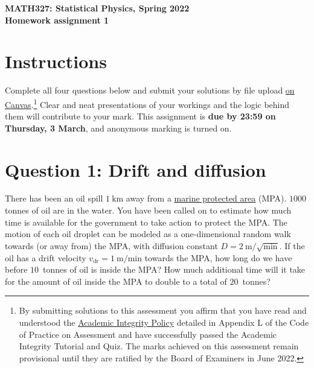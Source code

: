 \documentclass[12 pt]{article} %
\newcommand{\vdr}{\ensuremath{v_{\mathrm{dr}}} }
\begin{document}
\newcommand{\thisweek}{MATH327 Homework 1}
\newcommand{\moddate}{Last modified 21 Feb.~2022}
\begin{center}
  {\Large \textbf{MATH327: Statistical Physics, Spring 2022}} \\[12 pt]
  {\Large \textbf{Homework assignment 1}} \\[24 pt]
\end{center}

\section*{Instructions}
Complete all four questions below and submit your solutions by file upload \href{https://liverpool.instructure.com/courses/47333/assignments/178542}{on Canvas}.\footnote{By submitting solutions to this assessment you affirm that you have read and understood the \href{https://www.liverpool.ac.uk/media/livacuk/tqsd/code-of-practice-on-assessment/appendix_L_cop_assess.pdf}{Academic Integrity Policy} detailed in Appendix L of the Code of Practice on Assessment and have successfully passed the Academic Integrity Tutorial and Quiz.  The marks achieved on this assessment remain provisional until they are ratified by the Board of Examiners in June 2022.}
Clear and neat presentations of your workings and the logic behind them will contribute to your mark.
This assignment is \textbf{due by 23:59 on Thursday, 3 March}, and anonymous marking is turned on.



\vfill
\section*{Question 1: Drift and diffusion}
There has been an oil spill $1~\mathrm{km}$ away from a \href{https://en.wikipedia.org/wiki/Marine_protected_area}{marine protected area} (MPA).
$1000$ tonnes of oil are in the water.
You have been called on to estimate how much time is available for the government to take action to protect the MPA.
The motion of each oil droplet can be modeled as a one-dimensional random walk towards (or away from) the MPA, with diffusion constant $D = 2~\mathrm{m}/\sqrt{\mathrm{min}}$.
If the oil has a drift velocity $\vdr = 1~\mathrm{m}/\mathrm{min}$ towards the MPA, how long do we have before $10$~tonnes of oil is inside the MPA?
How much additional time will it take for the amount of oil inside the MPA to double to a total of $20$~tonnes?
\end{document}
